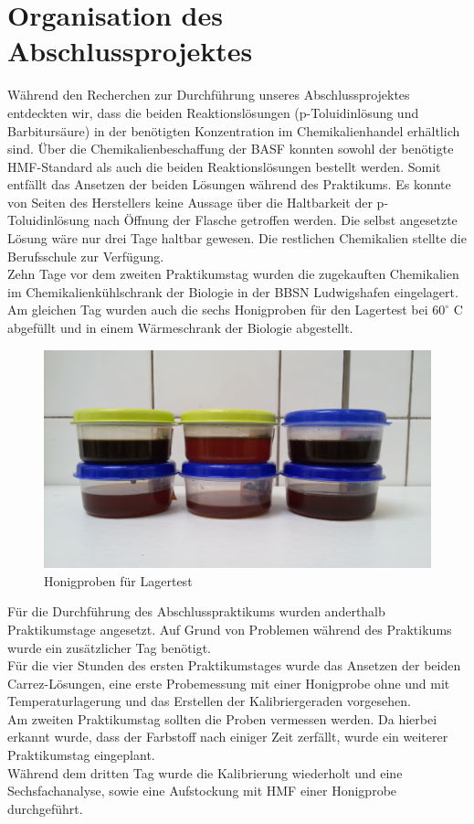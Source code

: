 \section{Organisation des Abschlussprojektes}
Während den Recherchen zur Durchführung unseres Abschlussprojektes entdeckten wir, dass die beiden Reaktionslösungen (p-Toluidinlösung und Barbitursäure) in der benötigten Konzentration im Chemikalienhandel erhältlich sind. Über die Chemikalienbeschaffung der BASF konnten sowohl der benötigte HMF-Standard als auch die beiden Reaktionslösungen bestellt werden. Somit entfällt das Ansetzen der beiden Lösungen während des Praktikums. Es konnte von Seiten des Herstellers keine Aussage über die Haltbarkeit der p-Toluidinlösung nach Öffnung der Flasche getroffen werden. Die selbst angesetzte Lösung wäre nur drei Tage haltbar gewesen. Die restlichen Chemikalien stellte die Berufsschule zur Verfügung. \\
Zehn Tage vor dem zweiten Praktikumstag wurden die zugekauften Chemikalien im Chemikalienkühlschrank der Biologie in der BBSN Ludwigshafen eingelagert. Am gleichen Tag wurden auch die sechs Honigproben für den Lagertest bei $60^\circ$ C abgefüllt und in einem Wärmeschrank der Biologie abgestellt.
\begin{figure}[htbp]
	\centering
		\includegraphics[width=1.00\textwidth]{../Bilder/20150504_141528.jpg}
	\caption{Honigproben für Lagertest}
	\label{fig:Lagertest}
\end{figure}
Für die Durchführung des Abschlusspraktikums wurden anderthalb Praktikumstage angesetzt. Auf Grund von Problemen während des Praktikums wurde ein zusätzlicher Tag benötigt. \\
Für die vier Stunden des ersten Praktikumstages wurde das Ansetzen der beiden Carrez-Lösungen, eine erste Probemessung mit einer Honigprobe ohne und mit Temperaturlagerung und das Erstellen der Kalibriergeraden vorgesehen.\\
Am zweiten Praktikumstag sollten die Proben vermessen werden. Da hierbei erkannt wurde, dass der Farbstoff nach einiger Zeit zerfällt, wurde ein weiterer Praktikumstag eingeplant.\\
Während dem dritten Tag wurde die Kalibrierung wiederholt und eine Sechsfachanalyse, sowie eine Aufstockung mit HMF einer Honigprobe durchgeführt.\\

